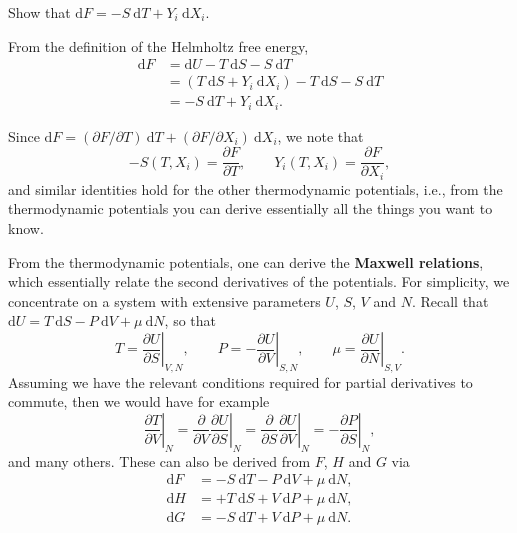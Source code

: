 \documentclass[letter-paper]{tufte-book}
\newenvironment{example}[1][Example]{\begin{trivlist}
\item[\hskip \labelsep {\bfseries #1}]}{\end{trivlist}}
\newcommand\Def[1]{\textbf{#1}}
\begin{document}
\begin{example}
Show that $\mathrm{d}F = -S\ \mathrm{d}T + Y_i\ \mathrm{d}X_i$.

From the definition of the Helmholtz free energy,
\begin{align*}
  \mathrm{d}F &= \mathrm{d}U - T\ \mathrm{d}S - S\ \mathrm{d}T\\
    &= (T\ \mathrm{d}S + Y_i\ \mathrm{d}X_i) - T\ \mathrm{d}S - S\ \mathrm{d}T\\
    &= -S\ \mathrm{d}T + Y_i\ \mathrm{d}X_i.
\end{align*}

Since $\mathrm{d}F = (\partial F / \partial T)\ \mathrm{d}T + (\partial F /
\partial X_i)\ \mathrm{d}X_i$, we note that
\begin{equation}
  -S(T, X_i) = \frac{\partial F}{\partial T}, \qquad Y_i(T, X_i) = \frac{\partial F}{\partial X_i},
\end{equation}
and similar identities hold for the other thermodynamic potentials, i.e., from
the thermodynamic potentials you can derive essentially all the things you want
to know.
\end{example}

From the thermodynamic potentials, one can derive the \Def{Maxwell relations},
which essentially relate the second derivatives of the potentials. For
simplicity, we concentrate on a system with extensive parameters $U$, $S$, $V$
and $N$. Recall that $\mathrm{d}U = T\ \mathrm{d}S - P\ \mathrm{d}V + \mu\
\mathrm{d}N$, so that
\begin{equation*}
  T = \left.\frac{\partial U}{\partial S}\right|_{V, N}, \qquad
  P = -\left.\frac{\partial U}{\partial V}\right|_{S, N}, \qquad
  \mu = \left.\frac{\partial U}{\partial N}\right|_{S, V}.
\end{equation*}
Assuming we have the relevant conditions required for partial derivatives to
commute, then we would have for example
\begin{equation*}
  \left.\frac{\partial T}{\partial V}\right|_N = \frac{\partial}{\partial V}\left.\frac{\partial U}{\partial S}\right|_N = \frac{\partial}{\partial S}\left.\frac{\partial U}{\partial V}\right|_N = -\left.\frac{\partial P}{\partial S}\right|_N,
\end{equation*}
and many others. These can also be derived from $F$, $H$ and $G$ via
\begin{align*}
  \mathrm{d}F &= -S\ \mathrm{d}T - P\ \mathrm{d}V + \mu\ \mathrm{d}N,\\
  \mathrm{d}H &= +T\ \mathrm{d}S + V\ \mathrm{d}P + \mu\ \mathrm{d}N,\\
  \mathrm{d}G &= -S\ \mathrm{d}T + V\ \mathrm{d}P + \mu\ \mathrm{d}N.
\end{align*}
\end{document}
